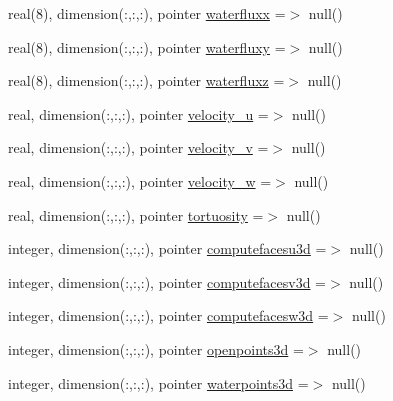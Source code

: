 \begin{DoxyCompactItemize}
\item 
real(8), dimension(\+:,\+:,\+:), pointer \mbox{\hyperlink{structmodulesedimentproperties_1_1t__external_a832a1c6948c966bc9dab15b812cc7465}{waterfluxx}} =$>$ null()
\item 
real(8), dimension(\+:,\+:,\+:), pointer \mbox{\hyperlink{structmodulesedimentproperties_1_1t__external_aa533e95068eddf6eeaf22440f28e0980}{waterfluxy}} =$>$ null()
\item 
real(8), dimension(\+:,\+:,\+:), pointer \mbox{\hyperlink{structmodulesedimentproperties_1_1t__external_a0dda4144e521ac39b94f60951a830315}{waterfluxz}} =$>$ null()
\item 
real, dimension(\+:,\+:,\+:), pointer \mbox{\hyperlink{structmodulesedimentproperties_1_1t__external_a70480900b0ddc938e7c04c3ccede7b12}{velocity\+\_\+u}} =$>$ null()
\item 
real, dimension(\+:,\+:,\+:), pointer \mbox{\hyperlink{structmodulesedimentproperties_1_1t__external_a86bd3443571e4edab50c6334c25a5e01}{velocity\+\_\+v}} =$>$ null()
\item 
real, dimension(\+:,\+:,\+:), pointer \mbox{\hyperlink{structmodulesedimentproperties_1_1t__external_a019c0c92a54ba8d8e281dacb71e4f4cb}{velocity\+\_\+w}} =$>$ null()
\item 
real, dimension(\+:,\+:,\+:), pointer \mbox{\hyperlink{structmodulesedimentproperties_1_1t__external_ac5b28e351ede59d5f75d7761cd4bce6d}{tortuosity}} =$>$ null()
\item 
integer, dimension(\+:,\+:,\+:), pointer \mbox{\hyperlink{structmodulesedimentproperties_1_1t__external_ab70d6df26080b939425a9672d3e372ab}{computefacesu3d}} =$>$ null()
\item 
integer, dimension(\+:,\+:,\+:), pointer \mbox{\hyperlink{structmodulesedimentproperties_1_1t__external_a0bda4d0237716c055c4974dfa548680e}{computefacesv3d}} =$>$ null()
\item 
integer, dimension(\+:,\+:,\+:), pointer \mbox{\hyperlink{structmodulesedimentproperties_1_1t__external_ad1e41743e9ee76147a3586c6f4c19d5b}{computefacesw3d}} =$>$ null()
\item 
integer, dimension(\+:,\+:,\+:), pointer \mbox{\hyperlink{structmodulesedimentproperties_1_1t__external_a9c3afd33f99e617a322fa3ff98e6a3c2}{openpoints3d}} =$>$ null()
\item 
integer, dimension(\+:,\+:,\+:), pointer \mbox{\hyperlink{structmodulesedimentproperties_1_1t__external_a086e1a4ca51b0254019e1376c5d2e4ea}{waterpoints3d}} =$>$ null()
\item 

\end{DoxyCompactItemize}
